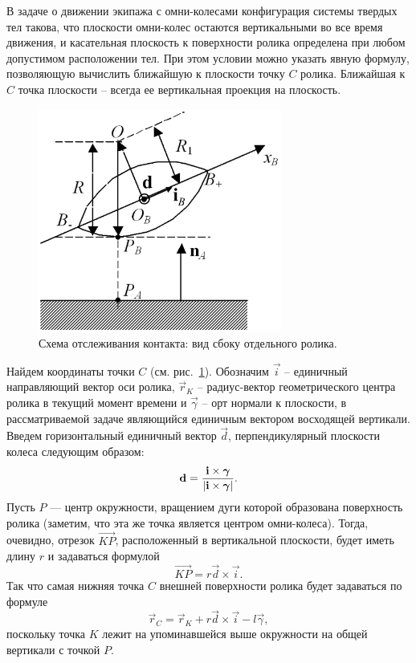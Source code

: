 В задаче о движении экипажа с омни-колесами конфигурация системы твердых тел такова, что плоскости омни-колес остаются вертикальными во все время движения, и касательная плоскость к поверхности ролика определена при любом допустимом расположении тел. При этом условии можно указать явную формулу, позволяющую вычислить ближайшую к плоскости точку $C$ ролика. Ближайшая к $C$ точка плоскости -- всегда ее вертикальная проекция на плоскость.

\begin{figure}[htb]
\centering\includegraphics[width=8cm]{content/parts/3_friction/nd/RollerSection_d_ib.png}
\caption{Схема отслеживания контакта: вид сбоку отдельного ролика.}
\label{ContactScheme}
\end{figure}

Найдем координаты точки $C$ (см. рис.~\ref{ContactScheme}). Обозначим $\vec{i}$ -- единичный направляющий вектор оси ролика, $\vec{r}_K$ -- радиус-вектор геометрического центра ролика в текущий момент времени и $\vec{\gamma}$ -- орт нормали к плоскости, в рассматриваемой задаче являющийся единичным вектором восходящей вертикали. Введем горизонтальный единичный вектор $\vec{d}$, перпендикулярный плоскости колеса следующим образом:
$$
    \boldsymbol{\mathbf{d}} = \displaystyle\frac{\displaystyle \boldsymbol{\mathbf{i}} \times \boldsymbol{\mathbf{\gamma}}}{\displaystyle \left| \boldsymbol{\mathbf{i}} \times \boldsymbol{\mathbf{\gamma}} \right|}.
$$
Пусть $P$ --- центр окружности, вращением дуги которой образована поверхность ролика (заметим, что эта же точка является центром омни-колеса). Тогда, очевидно, отрезок $\overrightarrow{KP}$, расположенный в вертикальной
плоскости, будет иметь длину $r$ и задаваться формулой
$$
    \overrightarrow{KP} = r\vec{d} \times \vec{i}.
$$
Так что самая нижняя точка $C$ внешней поверхности ролика будет задаваться по формуле
\begin{equation}
    \vec{r}_C = \vec{r}_K + r\vec{d} \times \vec{i} - l\vec{\gamma},
\label{3_2_0}
\end{equation}
поскольку точка $K$ лежит на упоминавшейся выше окружности на общей вертикали с точкой $P$.

